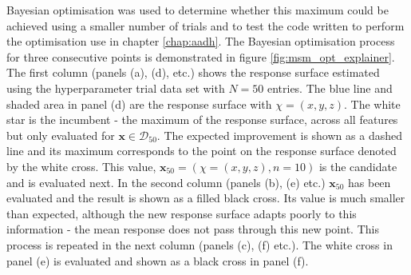 Bayesian optimisation was used to determine whether this maximum could be achieved using a smaller number of trials and to test the code written to perform the optimisation use in chapter \ref{chap:aadh}. The Bayesian optimisation process for three consecutive points is demonstrated in figure \ref{fig:msm_opt_explainer}. The first column (panels (a), (d), etc.) shows the response surface estimated using the hyperparameter trial data set with $N=50$ entries. The blue line and shaded area in panel (d) are the response surface with $\chi=(x, y, z)$. The white star is the incumbent - the maximum of the response surface, across all features but only evaluated for $\mathbf{x}\in \mathcal{D}_{50}$. The expected improvement is shown as a dashed line and its maximum corresponds to the point on the response surface denoted by the white cross. This value,  $\mathbf{x}_{50} = \left(\chi=(x, y, z), n=10\right)$ is the candidate and is evaluated next. In the second column (panels (b), (e) etc.) $\mathbf{x}_{50}$ has been evaluated and the result is shown as a filled black cross. Its value is much smaller than expected, although the new response surface adapts poorly to this information - the mean response does not pass through this new point. This process is repeated in the next column (panels (c), (f) etc.). The white cross in panel (e) is evaluated and shown as a black cross in panel (f). 

